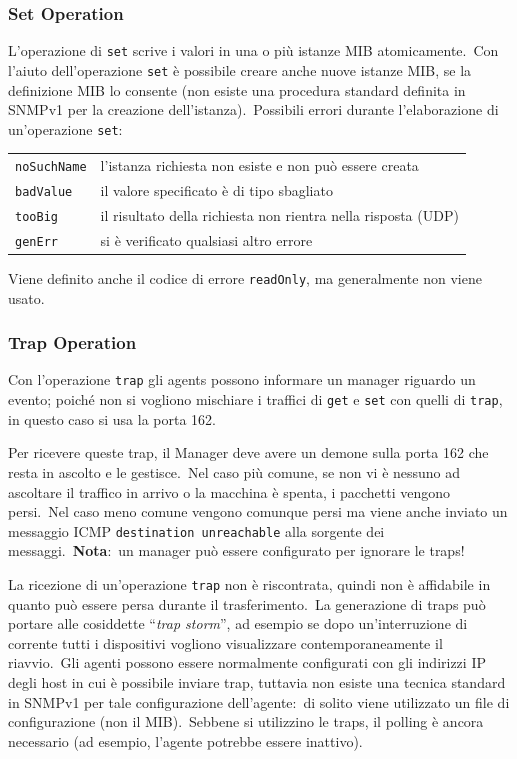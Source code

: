 \subsubsection{Set Operation}

L'operazione di \texttt{set} scrive i valori in una o più istanze MIB atomicamente.\
Con l'aiuto dell'operazione \texttt{set} è possibile creare anche nuove istanze MIB, se la definizione MIB lo consente (non esiste una procedura standard definita in SNMPv1 per la creazione dell'istanza).\
Possibili errori durante l'elaborazione di un'operazione \texttt{set}:

\begin{table}[H]
    \begin{tabular}{l l}
        \texttt{noSuchName} & l'istanza richiesta non esiste e non può essere creata        \\
        \texttt{badValue}   & il valore specificato è di tipo sbagliato                     \\
        \texttt{tooBig}     & il risultato della richiesta non rientra nella risposta (UDP) \\
        \texttt{genErr}     & si è verificato qualsiasi altro errore                        \\
    \end{tabular}
\end{table}

\noindent Viene definito anche il codice di errore \texttt{readOnly}, ma generalmente non viene usato.

\subsubsection{Trap Operation}

Con l'operazione \texttt{trap} gli agents possono informare un manager riguardo un evento; poiché non si vogliono mischiare i traffici di \texttt{get} e \texttt{set} con quelli di \texttt{trap}, in questo caso si usa la porta 162.\

Per ricevere queste trap, il Manager deve avere un demone sulla porta 162 che resta in ascolto e le gestisce.\
Nel caso più comune, se non vi è nessuno ad ascoltare il traffico in arrivo o la macchina è spenta, i pacchetti vengono persi.\ Nel caso meno comune vengono comunque persi ma viene anche inviato un messaggio ICMP \texttt{destination unreachable} alla sorgente dei messaggi.\
\textbf{Nota}:\ un manager può essere configurato per ignorare le traps!\

La ricezione di un'operazione \texttt{trap} non è riscontrata, quindi non è affidabile in quanto può essere persa durante il trasferimento.\
La generazione di traps può portare alle cosiddette ``\textit{trap storm}'', ad esempio se dopo un'interruzione di corrente tutti i dispositivi vogliono visualizzare contemporaneamente il riavvio.\
Gli agenti possono essere normalmente configurati con gli indirizzi IP degli host in cui è possibile inviare trap, tuttavia non esiste una tecnica standard in SNMPv1 per tale configurazione dell'agente:\ di solito viene utilizzato un file di configurazione (non il MIB).\
Sebbene si utilizzino le traps, il polling è ancora necessario (ad esempio, l'agente potrebbe essere inattivo).\

